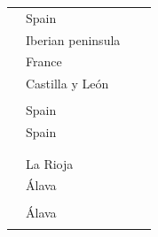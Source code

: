 {\begin{longtable}{llll}
 & Spain & \citet{Gallegoetal2012PhenolicCompounds}\\
 & Iberian peninsula & \citet{Alanonetal2011InfluenceGeographical}\\
 & France & \citet{FernandezdeSimonetal2010CharacterizationVolatile}\\
 & Castilla y León & \citet{RodriguezBencomoetal2008ImportanceChip}\\
 &  & \citet{FernandezdeSimonetal2009VolatileCompounds}\\
 & Spain & \citet{FernandezdeSimonetal2008VolatileCompounds}\\
 & Spain & \citet{FernandezdeSimonetal2006ChemicalCharacterization}\\
 &  & \citet{Jordaoetal2006VolatileComposition}\\
 &  & \citet{DeConincketal2006EvolutionPhenolic}\\
 & La Rioja & \citet{FernandezdeSimonetal2003VolatileCompounds}\\
 & Álava & \citet{Cadahiaetal2003VolatileCompounds}\\
 &  & \citet{FernandezdeSimonetal1999EvolutionPhenolic}\\
 & Álava & \citet{Cadahiaetal2001EvolutionEllagitannins}\\
 &  & \citet{FernandezdeSimonetal1996LowMolecular}\\
\bottomrule
\end{longtable}
}%